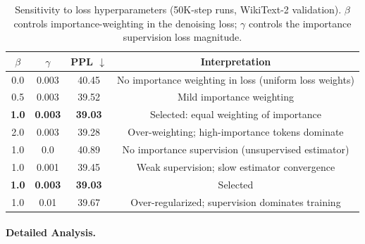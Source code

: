\begin{table}[h]
\centering
\caption{Sensitivity to loss hyperparameters (50K-step runs, WikiText-2 validation). $\beta$ controls importance-weighting in the denoising loss; $\gamma$ controls the importance supervision loss magnitude.}
\label{tab:beta-gamma}
\begin{tabular}{cccc}
\toprule
$\beta$ & $\gamma$ & \textbf{PPL} $\downarrow$ & \textbf{Interpretation} \\
\midrule
0.0 & 0.003 & 40.45 & No importance weighting in loss (uniform loss weights) \\
0.5 & 0.003 & 39.52 & Mild importance weighting \\
\textbf{1.0} & \textbf{0.003} & \textbf{39.03} & Selected: equal weighting of importance \\
2.0 & 0.003 & 39.28 & Over-weighting; high-importance tokens dominate \\
\midrule
1.0 & 0.0 & 40.89 & No importance supervision (unsupervised estimator) \\
1.0 & 0.001 & 39.45 & Weak supervision; slow estimator convergence \\
\textbf{1.0} & \textbf{0.003} & \textbf{39.03} & Selected \\
1.0 & 0.01 & 39.67 & Over-regularized; supervision dominates training \\
\bottomrule
\end{tabular}
\end{table}

\paragraph{Detailed Analysis.}

